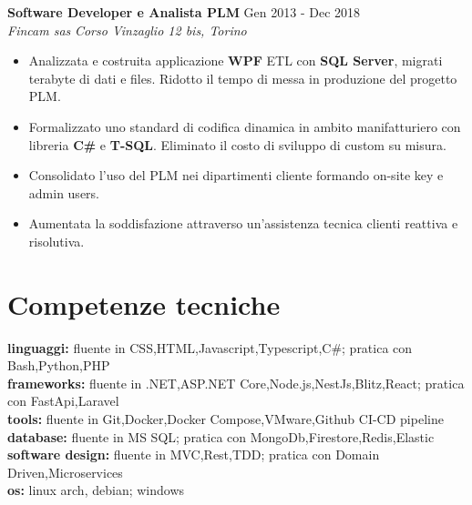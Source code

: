 \documentclass[10pt]{article}
\begin{document}
\vspace{0.4em}

\noindent \large\textbf{Software Developer e Analista PLM} \hfill Gen 2013 - Dec 2018 \\
\textit{Fincam sas} \hfill \textit{Corso Vinzaglio 12 bis, Torino}
\begin{itemize}[noitemsep,nolistsep,leftmargin=1em]
	\item Analizzata e costruita applicazione \textbf{WPF} ETL con \textbf{SQL Server}, migrati terabyte di dati e files. Ridotto il tempo di messa in produzione del progetto PLM.
	\item Formalizzato uno standard di codifica dinamica in ambito manifatturiero con libreria \textbf{C\#} e \textbf{T-SQL}. Eliminato il costo di sviluppo di custom su misura.
	\item Consolidato l'uso del PLM nei dipartimenti cliente formando on-site key e admin users.
	\item Aumentata la soddisfazione attraverso un'assistenza tecnica clienti reattiva e risolutiva. 
\end{itemize}

\vspace{-0.8em}

\section{Competenze tecniche}
\textbf{linguaggi:} fluente in CSS,HTML,Javascript,Typescript,C\#; pratica con Bash,Python,PHP \\
\textbf{frameworks:} fluente in .NET,ASP.NET Core,Node.js,NestJs,Blitz,React; pratica con FastApi,Laravel\\
\textbf{tools:} fluente in Git,Docker,Docker Compose,VMware,Github CI-CD pipeline\\
\textbf{database:} fluente in MS SQL; pratica con MongoDb,Firestore,Redis,Elastic\\
\textbf{software design:} fluente in MVC,Rest,TDD; pratica con Domain Driven,Microservices\\
\textbf{os:} linux arch, debian; windows

\vspace{-0.8em}
\end{document}
